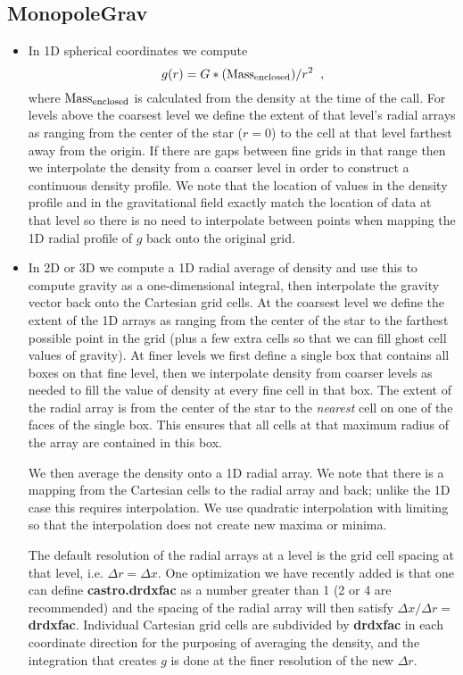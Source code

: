 \subsection{MonopoleGrav}\label{sec-monopole-grav}
\begin{itemize}

\item In 1D spherical coordinates we compute 
\[g(r) = G * ({\rm Mass_{enclosed}}) / r^2 \; \; , \]
where ${\rm Mass_{enclosed}}$ is calculated from the density at the time of the call. 
For levels above the coarsest level we define the extent of that level's radial arrays 
as ranging from the center of the star ($r=0$) to the cell at that level farthest away from the
origin.  If there are gaps between fine grids in that range then we interpolate the density
from a coarser level in order to construct a continuous density profile.  We note that
the location of values in the density profile and in the gravitational field exactly match the
location of data at that level so there is no need to interpolate between points when
mapping the 1D radial profile of $g$ back onto the original grid.

\item In 2D or 3D we compute a 1D radial average of density and use this to compute 
gravity as a one-dimensional integral, then interpolate the gravity vector back onto 
the Cartesian grid cells. At the coarsest level we define the extent of the 1D arrays as
ranging from the center of the star to the farthest possible point in the grid (plus a
few extra cells so that we can fill ghost cell values of gravity).  At finer levels
we first define a single box that contains all boxes on that fine level, then we
interpolate density from coarser levels as needed to fill the value of density at every
fine cell in that box.   The extent of the radial array is from the center of the star
to the {\em nearest} cell on one of the faces of the single box.  This ensures that
all cells at that maximum radius of the array are contained in this box.

We then average the density onto a 1D radial array.
We note that there is a mapping from the Cartesian cells to the radial array and back;
unlike the 1D case this requires interpolation. We use quadratic interpolation with
limiting so that the interpolation does not create new maxima or minima.

The default resolution of the radial arrays at a level is the grid cell spacing at
that level, i.e. $\Delta r = \Delta x.$   One optimization we have recently added is that one 
can define {\bf castro.drdxfac} as a number greater than 1 (2 or 4 are recommended) and the
spacing of the radial array will then satisfy $\Delta x / \Delta r = $ {\bf drdxfac}.
Individual Cartesian grid cells are subdivided by {\bf drdxfac} in each coordinate direction
for the purposing of averaging the density, and the integration that creates $g$ is
done at the finer resolution of the new $\Delta r.$   


\end{itemize}
